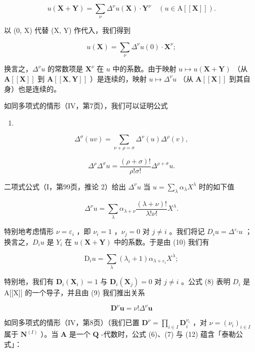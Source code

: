 \[
u (\mathbf {X} + \mathbf {Y}) = \sum_ {\nu} \Delta^ {\nu} u (\mathbf {X}) \cdot \mathbf {Y} ^ {\nu} \quad (u \in \mathrm{A} [ [ \mathbf {X} ] ]).\tag{6}
\]

以 (0, X) 代替 (X, Y) 作代入，我们得到

\[
u (\mathbf {X}) = \sum_ {\nu} \Delta^ {\nu} u (0) \cdot \mathbf {X} ^ {\nu};\tag{7}
\]

换言之，\(\Delta^{\nu}u\) 的常数项是 \(\mathbf{X}^{\nu}\) 在 \(u\) 中的系数。由于映射 \(u \mapsto u(\mathbf{X} + \mathbf{Y})\) （从 \(\mathbf{A}[[\mathbf{X}]]\) 到 \(\mathbf{A}[[\mathbf{X}, \mathbf{Y}]]\) ）是连续的，映射 \(u \mapsto \Delta^{\nu}u\) （从 \(\mathbf{A}[[\mathbf{X}]]\) 到其自身）也是连续的。

如同多项式的情形（IV，第7页），我们可以证明公式

\begin{enumerate}
\def\labelenumi{(\arabic{enumi})}
\setcounter{enumi}{7}
\tightlist
\item
\end{enumerate}

\[
\Delta^ {\sigma} (u v) = \sum_ {\nu + \rho = \sigma} \Delta^ {\nu} (u) \Delta^ {\rho} (v),
\]

\[
\Delta^ {\rho} \Delta^ {\sigma} u = \frac {(\rho + \sigma) !}{\rho ! \sigma !} \Delta^ {\rho + \sigma} u.\tag{9}
\]

二项式公式（I，第99页，推论 2）给出 \(\Delta^{\nu}u\) 当 \(u = \sum_{\lambda} \alpha_{\lambda} X^{\lambda}\) 时的如下值

\[
\Delta^ {\nu} u = \sum_ {\lambda} \alpha_ {\lambda + \nu} \frac {(\lambda + \nu) !}{\lambda ! \nu !} X ^ {\lambda}.\tag{10}
\]

特别地考虑情形 \(\nu = \varepsilon_{i}\) ，即 \(\nu_{i} = 1\) ，\(\nu_{j} = 0\) 对 \(j \neq i\) 。我们将记 \(D_{i}u = \Delta^{\varepsilon_{i}}u\) ；换言之，\(D_{i}u\) 是 \(Y_{i}\) 在 \(u(\mathbf{X} + \mathbf{Y})\) 中的系数。于是由 (10) 我们有

\[
\mathrm{D} _ {i} u = \sum_ {\lambda} (\lambda_ {i} + 1) \alpha_ {\lambda + \varepsilon_ {i}} X ^ {\lambda};\tag{11}
\]

特别地，我们有 \(\mathbf{D}_{i}(\mathbf{X}_{i})=1\) 与 \(\mathbf{D}_{i}(\mathbf{X}_{j})=0\) 对 \(j\neq i\) 。公式 (8) 表明 \(D_{i}\) 是 A{[}{[}X{]}{]} 的一个导子，并且由 (9) 我们推出关系

\[
\mathbf {D} ^ {\nu} \boldsymbol {u} = \nu ! \Delta^ {\nu} \boldsymbol {u}\tag{12}
\]

如同多项式的情形（IV，第8页）（我们已置 \(\mathbf{D}^{\nu} = \prod_{i\in I}\mathbf{D}_{i}^{\nu_{i}}\) ，对 \(\nu = (\nu_{i})_{i\in I}\) 属于 \(\mathbf{N}^{(I)}\) ）。当 \(\mathbf{A}\) 是一个 \(\mathbf{Q}\) -代数时，公式 (6)、(7) 与 (12) 蕴含「泰勒公式」：

